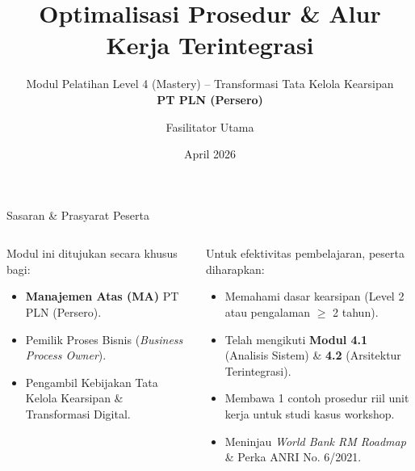\documentclass[aspectratio=169,11pt]{beamer}
\title{Optimalisasi Prosedur \& Alur Kerja Terintegrasi}
\subtitle{Modul Pelatihan Level 4 (Mastery) -- Transformasi Tata Kelola Kearsipan\\ \textbf{PT PLN (Persero)}}
\author{Fasilitator Utama}
\institute[PLN]{Center of Excellence Records Management}
\date{April 2026}
\begin{document}

{
\beamertemplatenavigationsymbolsempty
\begin{frame}[plain]
    \titlepage
\end{frame}
}

\begin{frame}{Sasaran \& Prasyarat Peserta}
    \vspace{0.2cm}
    \begin{columns}[T]
        \begin{premiumbox}
            \small
            Modul ini ditujukan secara khusus bagi:
            \begin{itemize}
                \item \textbf{Manajemen Atas (MA)} PT PLN (Persero).
                \item Pemilik Proses Bisnis (\textit{Business Process Owner}).
                \item Pengambil Kebijakan Tata Kelola Kearsipan \& Transformasi Digital.
            \end{itemize}
        \end{premiumbox}
        
        \begin{orangebox}
            \scriptsize
            Untuk efektivitas pembelajaran, peserta diharapkan:
            \begin{itemize}
                \item Memahami dasar kearsipan (Level 2 atau pengalaman $\ge$ 2 tahun).
                \item Telah mengikuti \textbf{Modul 4.1} (Analisis Sistem) \& \textbf{4.2} (Arsitektur Terintegrasi).
                \item Membawa 1 contoh prosedur riil unit kerja untuk studi kasus workshop.
                \item Meninjau \textit{World Bank RM Roadmap} \& Perka ANRI No. 6/2021.
            \end{itemize}
        \end{orangebox}
    \end{columns}
\end{frame}
\end{document}

